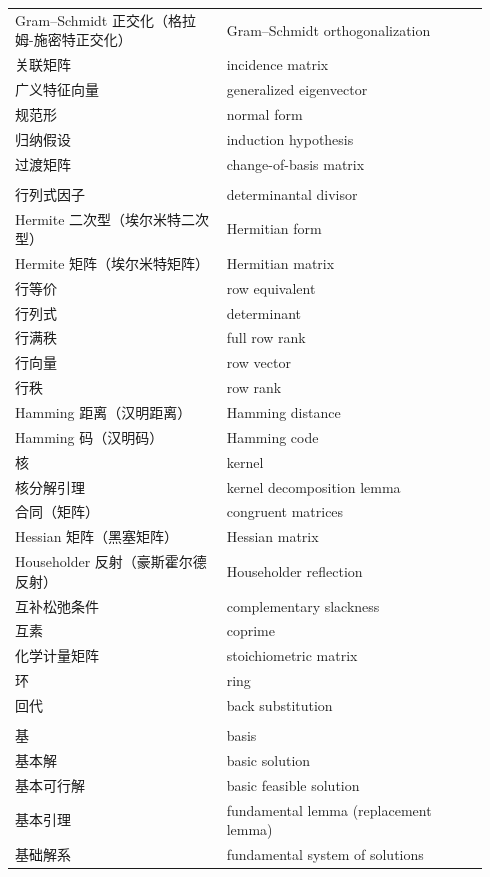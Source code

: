 {\begin{longtable}{p{0.42\linewidth}p{0.52\linewidth}}
		Gram–Schmidt 正交化（格拉姆-施密特正交化） & Gram–Schmidt orthogonalization \\
		关联矩阵 & incidence matrix \\
		广义特征向量 & generalized eigenvector \\
		规范形 & normal form \\
		归纳假设 & induction hypothesis \\
		过渡矩阵 & change-of-basis matrix \\
		\addlinespace
		\multicolumn{2}{l}{\textbf{\sffamily H}} \\
		行列式因子 & determinantal divisor \\
		Hermite 二次型（埃尔米特二次型） & Hermitian form \\
		Hermite 矩阵（埃尔米特矩阵） & Hermitian matrix \\
		行等价 & row equivalent \\
		行列式 & determinant \\
		行满秩 & full row rank \\
		行向量 & row vector \\
		行秩 & row rank \\
		Hamming 距离（汉明距离） & Hamming distance \\
		Hamming 码（汉明码） & Hamming code \\
		核 & kernel \\
		核分解引理 & kernel decomposition lemma \\
		合同（矩阵） & congruent matrices \\
		Hessian 矩阵（黑塞矩阵） & Hessian matrix \\
		Householder 反射（豪斯霍尔德反射） & Householder reflection \\
		互补松弛条件 & complementary slackness \\
		互素 & coprime \\
		化学计量矩阵 & stoichiometric matrix \\
		环 & ring \\
		回代 & back substitution \\
		\addlinespace
		\multicolumn{2}{l}{\textbf{\sffamily J}} \\
		基 & basis \\
		基本解 & basic solution \\
		基本可行解 & basic feasible solution \\
		基本引理 & fundamental lemma (replacement lemma) \\
		基础解系 & fundamental system of solutions \\

\end{longtable}}
